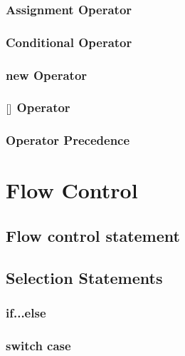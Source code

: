 \documentclass[14pt,fleqn]{extbook} %
\newcommand{\s} {
	\hphantom{} \hphantom{} \hphantom{}
}
\begin{document}
\subsection{Assignment Operator}

\subsection{Conditional Operator}

%
\subsection{new Operator}

\subsection{ $\left[ \s \right]$ Operator}

\subsection{Operator Precedence}


\chapter{Flow Control}
\section{Flow control statement}

\section{Selection Statements}

\subsection{if...else}

\subsection{switch case}

\end{document}
